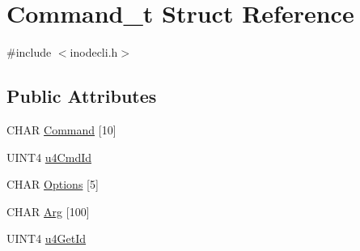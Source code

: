 \hypertarget{structCommand__t}{\section{Command\+\_\+t Struct Reference}
\label{structCommand__t}
}


{\ttfamily \#include $<$inodecli.\+h$>$}

\subsection*{Public Attributes}
\begin{DoxyCompactItemize}
\item 
C\+H\+A\+R \hyperlink{structCommand__t_a78320e9f061009774a25879ff29727b7}{Command} \mbox{[}10\mbox{]}
\item 
U\+I\+N\+T4 \hyperlink{structCommand__t_aeadb3c458b96a4a0622e5093eea58f54}{u4\+Cmd\+Id}
\item 
C\+H\+A\+R \hyperlink{structCommand__t_a7a930bcd047b7ed2d5fe372cb9400003}{Options} \mbox{[}5\mbox{]}
\item 
C\+H\+A\+R \hyperlink{structCommand__t_a6f5c12b905882fb8c3e75001895fdba8}{Arg} \mbox{[}100\mbox{]}
\item 
U\+I\+N\+T4 \hyperlink{structCommand__t_aaef7e79094d7a357b0dc8db61e7d4e3b}{u4\+Get\+Id}
\end{DoxyCompactItemize}


